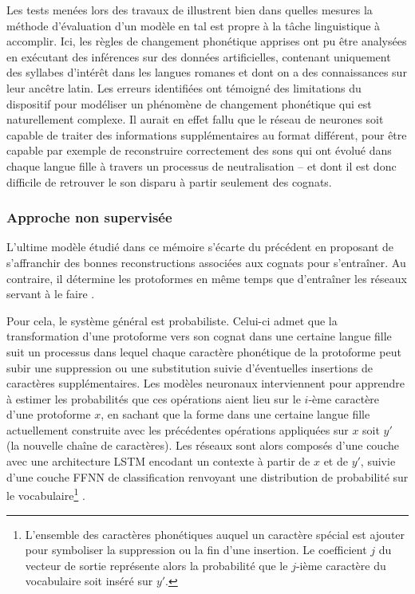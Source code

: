 \documentclass[12pt, twoside]{report}
\begin{document}
Les tests menées lors des travaux de \cite{meloni-etal-2021-ab} illustrent bien dans quelles mesures la méthode d'évaluation d'un modèle en \Gls{tal} est propre à la tâche linguistique à accomplir. Ici, les règles de changement phonétique apprises ont pu être analysées en exécutant des inférences sur des données artificielles, contenant uniquement des syllabes d'intérêt dans les langues romanes et dont on a des connaissances sur leur ancêtre latin. Les erreurs identifiées ont témoigné des limitations du dispositif pour modéliser un phénomène de changement phonétique qui est naturellement complexe. Il aurait en effet fallu que le réseau de neurones soit capable de traiter des informations supplémentaires au format différent, pour être capable par exemple de reconstruire correctement des sons qui ont évolué dans chaque langue fille à travers un processus de neutralisation -- et dont il est donc difficile de retrouver le son disparu à partir seulement des cognats.

\subsubsection{Approche non supervisée}

L'ultime modèle étudié dans ce mémoire s'écarte du précédent en proposant de s'affranchir des bonnes reconstructions associées aux \glspl{cognat} pour s'entraîner. Au contraire, il détermine les \glspl{protoforme} en même temps que d'entraîner les réseaux servant à le faire \autocite{he2022neural}.

\vspace{12pt}
Pour cela, le système général est probabiliste. Celui-ci admet que la transformation d'une \gls{protoforme} vers son \gls{cognat} dans une certaine langue fille suit un processus dans lequel chaque caractère phonétique de la \gls{protoforme} peut subir une suppression ou une substitution suivie d'éventuelles insertions de caractères supplémentaires. Les modèles neuronaux interviennent pour apprendre à estimer les probabilités que ces opérations aient lieu sur le $i$-ème caractère d'une \gls{protoforme} $x$, en sachant que la forme dans une certaine langue fille actuellement construite avec les précédentes opérations appliquées sur $x$ soit $y'$ (la nouvelle chaîne de caractères). Les réseaux sont alors composés d'une couche avec une architecture LSTM encodant un contexte à partir de $x$ et de $y'$, suivie d'une couche FFNN de classification renvoyant une distribution de probabilité sur le vocabulaire\footnote{L'ensemble des caractères phonétiques auquel un caractère spécial est ajouter pour symboliser la suppression ou la fin d'une insertion. Le coefficient $j$ du vecteur de sortie représente alors la probabilité que le $j$-ième caractère du vocabulaire soit inséré sur $y'$.} \autocite[section 4-5]{he2022neural}.
\end{document}
